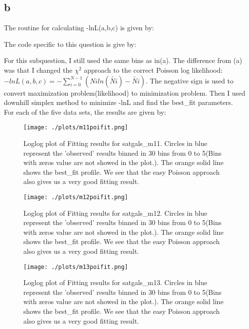 \subsection{b}
The routine for calculating -lnL(a,b,c) is given by:

The code specific to this question is give by:


For this subquestion, I still used the same bins as in(a). The difference from (a) was that I changed the $\chi ^{2}$ approach to the correct Poisson log likelihood: $-lnL(a,b,c)=-\sum_{i=0}^{N-1} (Ni ln(\tilde{Ni})-\tilde{Ni})$. The negative sign is used to convert maximization problem(likelihood) to minimization problem. Then I used downhill simplex method to minimize -lnL and find the best\_fit parameters.\\
For each of the five data sets, the results are given by:


\begin{figure}[h!]
  \centering
  \texttt{[image: ./plots/m11poifit.png]}
  \caption{Loglog plot of Fitting results for satgals\_m11. Circles in blue represent the 'observed' results binned in 30 bins from 0 to 5(Bins with zeros value are not showed in the plot.). The orange solid line shows the best\_fit profile. We see that the easy Poisson approach also gives us a very good fitting result.}
  \label{fig6}
\end{figure}



\begin{figure}[h!]
  \centering
  \texttt{[image: ./plots/m12poifit.png]}
  \caption{Loglog plot of Fitting results for satgals\_m12. Circles in blue represent the 'observed' results binned in 30 bins from 0 to 5(Bins with zeros value are not showed in the plot.). The orange solid line shows the best\_fit profile. We see that the easy Poisson approach also gives us a very good fitting result.}
  \label{fig7}
\end{figure}



\begin{figure}[h!]
  \centering
  \texttt{[image: ./plots/m13poifit.png]}
  \caption{Loglog plot of Fitting results for satgals\_m13. Circles in blue represent the 'observed' results binned in 30 bins from 0 to 5(Bins with zeros value are not showed in the plot.). The orange solid line shows the best\_fit profile. We see that the easy Poisson approach also gives us a very good fitting result.}
  \label{fig8}
\end{figure}

